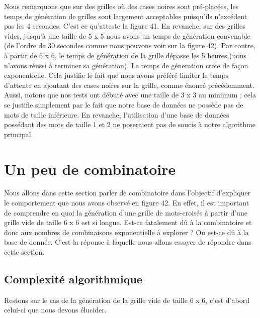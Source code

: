 \documentclass [ 11 pt ] {article}
\begin{document}
    Nous remarquons que sur des grilles où des cases noires sont pré-placées, les temps de génération de grilles sont largement acceptables puisqu'ils n'excédent pas les 4 secondes. C'est ce qu'atteste la figure 41. En revanche, sur des grilles vides, jusqu'à une taille de 5 x 5 nous avons un temps de génération convenable (de l'ordre de 30 secondes comme nous pouvons voir sur la figure 42). Par contre, à partir de 6 x 6, le temps de génération de la grille dépasse les 5 heures (nous n'avons réussi à terminer sa génération). Le temps de géneration croie de façon exponentielle.  Cela justifie le fait que nous avons préféré limiter le temps d'attente en ajoutant des cases noires sur la grille, comme énoncé précédemment. \\
    Aussi, notons que nos tests ont débuté avec une taille de 3 x 3 au minimum ; cela se justifie simplement par le fait que notre base de données ne possède pas de mots de taille inférieure. En revanche, l'utilisation d'une base de données possédant des mots de taille 1 et 2 ne poseraient pas de soucis à notre algorithme principal. \\
    
    \section{Un peu de combinatoire}
    
    \hspace*{0.6cm}Nous allons dans cette section parler de combinatoire dans l'objectif d'expliquer le comportement que nous avons observé en figure 42. En effet, il est important de comprendre en quoi la génération d'une grille de mots-croisés à partir d'une grille vide de taille 6 x 6 est si longue. Est-ce fatalement dû à la combinatoire et donc aux nombres de combinaisons exponentielle à explorer ? Ou est-ce dû à la base de donnée. C'est la réponse à laquelle nous allons essayer de répondre dans cette section. 
    
        \subsection{Complexité algorithmique}
        \hspace*{0.6cm} Restons sur le cas de la génération de la grille vide de taille 6 x 6, c'est d'abord celui-ci que nous devons élucider. 
        \newpage
\end{document}
